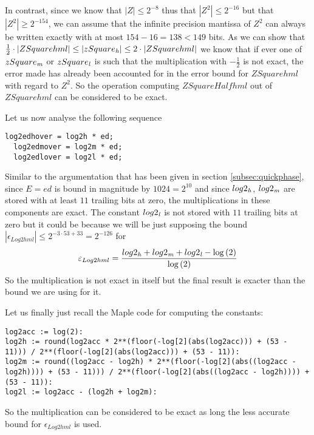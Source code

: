 In contrast, since we know that $\left \vert Z \right \vert \leq 2^{-8}$
thus that $\left \vert Z^2 \right \vert \leq 2^{-16}$ but that $\left \vert Z^2 \right \vert \geq 2^{-154}$, we can
assume that the infinite precision mantissa of $Z^2$ can always be written exactly with at most $154 - 16 = 138 < 149$ 
bits. As we can show that 
$\frac{1}{2} \cdot \left \vert ZSquarehml \right \vert \leq \left \vert zSquare_{\mathit{h}} \right \vert \leq 
2 \cdot \left \vert ZSquarehml \right \vert$ we know that if ever one of $zSquare_{\mathit{m}}$ or $zSquare_{\mathit{l}}$ is such that
the multiplication with $-\frac{1}{2}$ is not exact, the error made has already been accounted for in the error bound
for $ZSquarehml$ with regard to $Z^2$.
So the operation computing $ZSquareHalfhml$ out of $ZSquarehml$ can be considered to be exact. \par
Let us now analyse the following sequence 
\begin{lstlisting}[caption={Multiplication of triple-double $Log2hml$ by $E$},firstnumber=126]
  log2edhover = log2h * ed;
  log2edmover = log2m * ed;
  log2edlover = log2l * ed;
\end{lstlisting}
Similar to the argumentation that has been given in section \ref{subsec:quickphase}, since $E=ed$ is bound
in magnitude by $1024=2^{10}$ and since $log2_{\mathit{h}}$, $log2_{\mathit{m}}$ are stored with at least $11$ trailing bits at zero,
the multiplications in these components are exact. The constant $log2_{\mathit{l}}$ is not stored with $11$ trailing bits at zero
but it could be because we will be just supposing the bound $\left \vert \epsilon_{Log2hml} \right \vert \leq 2^{-3 \cdot 53 + 33} = 2^{-126}$ for
$$\varepsilon_{Log2hml} = \frac{log2_{\mathit{h}} + log2_{\mathit{m}} + log2_{\mathit{l}} - \log\left( 2 \right)}{\log\left( 2 \right)}$$
So the multiplication is not exact in itself but the final result is exacter than the bound we are using for it.

Let us finally just recall the Maple code for computing the constants:
\begin{lstlisting}[caption={Maple code for computing $Log2hml$},firstnumber=21]
log2acc := log(2):
log2h := round(log2acc * 2**(floor(-log[2](abs(log2acc))) + (53 - 11))) / 2**(floor(-log[2](abs(log2acc))) + (53 - 11)):
log2m := round((log2acc - log2h) * 2**(floor(-log[2](abs((log2acc - log2h)))) + (53 - 11))) / 2**(floor(-log[2](abs((log2acc - log2h)))) + (53 - 11)):
log2l := log2acc - (log2h + log2m):
\end{lstlisting}
So the multiplication can be considered to be exact as long the less accurate bound for $\epsilon_{Log2hml}$ is used. 

